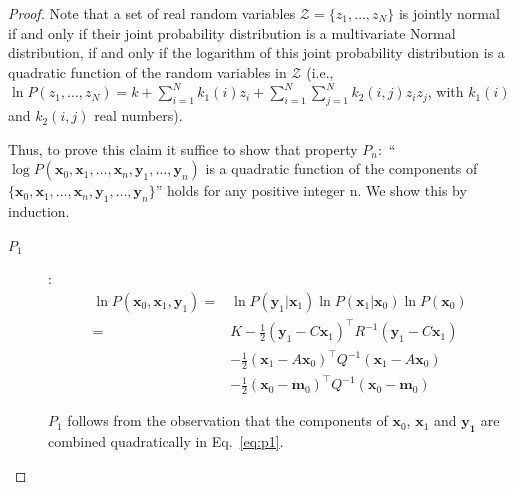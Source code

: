 \documentclass[12pt]{article}
\begin{document}
\begin{proof}

    Note that a set of real random variables $\mathcal{Z}=\{z_1,\ldots,z_N\}$ is
    jointly normal if and only if their joint probability distribution is a
    multivariate Normal distribution, if and only if the logarithm of this
    joint probability distribution is a quadratic function of the random
    variables in $\mathcal{Z}$ (i.e., $\ln P(z_1,\ldots,z_N)=k+\sum_{i=1}^N
    k_1(i)z_i+\sum_{i=1}^N\sum_{j=1}^Nk_2(i,j)z_iz_j$, with $k_1(i)$ and
    $k_2(i,j)$ real numbers).

    Thus, to prove this claim it suffice to show that property $P_n$:\ ``$\log
    P(\mathbf{x}_0, \mathbf{x}_1, \ldots, \mathbf{x}_n, \mathbf{y}_1, \ldots,
    \mathbf{y}_n)$  is a quadratic function of the components of
    $\{\mathbf{x}_0, \mathbf{x}_1, \ldots, \mathbf{x}_n, \mathbf{y}_1, \ldots,
    \mathbf{y}_n\}$'' holds for any positive integer n. We show this by
    induction.

    \begin{description}
        \item[$P_1$]:
            \begin{align}
                \ln P(\mathbf{x}_0, \mathbf{x}_1, \mathbf{y}_1)=&\ln P(\mathbf{y}_1|\mathbf{x}_1)\ln P(\mathbf{x}_1|\mathbf{x}_0)\ln P(\mathbf{x}_0)\nonumber\\
                                                               =&K-\frac{1}{2}(\mathbf{y}_1-C\mathbf{x}_1)^\intercal R^{-1}(\mathbf{y}_1-C\mathbf{x}_1)\nonumber\\
                                                                &-\frac{1}{2}(\mathbf{x}_1-A\mathbf{x}_0)^\intercal Q^{-1}(\mathbf{x}_1-A\mathbf{x}_0)\nonumber\\
                                                                &-\frac{1}{2}(\mathbf{x}_0-\mathbf{m}_0)^\intercal Q^{-1}(\mathbf{x}_0-\mathbf{m}_0)\label{eq:p1}
            \end{align}

            $P_1$ follows from the observation that the components of
            $\mathbf{x}_0$, $\mathbf{x}_1$ and $\mathbf{y_1}$ are combined
            quadratically in Eq.~\ref{eq:p1}.


\end{description}
\end{proof}
\end{document}
